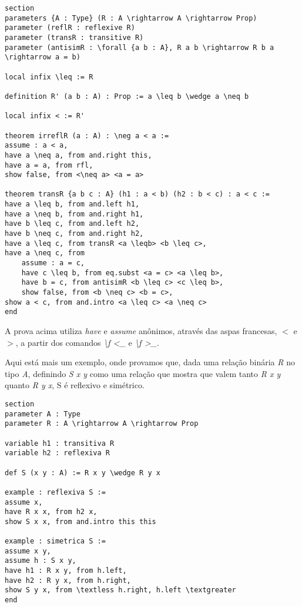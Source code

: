 \begin{lstlisting}
section
parameters {A : Type} (R : A \rightarrow A \rightarrow Prop)
parameter (reflR : reflexive R)
parameter (transR : transitive R)
parameter (antisimR : \forall {a b : A}, R a b \rightarrow R b a \rightarrow a = b)

local infix \leq := R

definition R' (a b : A) : Prop := a \leq b \wedge a \neq b

local infix < := R'

theorem irreflR (a : A) : \neg a < a :=
assume : a < a,
have a \neq a, from and.right this,
have a = a, from rfl,
show false, from <\neq a> <a = a>

theorem transR {a b c : A} (h1 : a < b) (h2 : b < c) : a < c :=
have a \leq b, from and.left h1,
have a \neq b, from and.right h1,
have b \leq c, from and.left h2,
have b \neq c, from and.right h2,
have a \leq c, from transR <a \leqb> <b \leq c>,
have a \neq c, from
    assume : a = c,
    have c \leq b, from eq.subst <a = c> <a \leq b>,
    have b = c, from antisimR <b \leq c> <c \leq b>,
    show false, from <b \neq c> <b = c>,
show a < c, from and.intro <a \leq c> <a \neq c>
end

\end{lstlisting}
A prova acima utiliza \textit{have} e \textit{assume} anônimos, através das aspas francesas, $<$ e $>$, a partir dos comandos \textit{\textbackslash f \textless \_} e \textit{\textbackslash f \textgreater \_}.

Aqui está mais um exemplo, onde provamos que, dada uma relação binária \textit{R} no tipo \textit{A}, definindo \textit{S x y} como uma relação que mostra que valem tanto \textit{R x y} quanto \textit{R y x}, S é reflexivo e simétrico.
\begin{lstlisting}
section
parameter A : Type
parameter R : A \rightarrow A \rightarrow Prop

variable h1 : transitiva R
variable h2 : reflexiva R

def S (x y : A) := R x y \wedge R y x

example : reflexiva S :=
assume x,
have R x x, from h2 x,
show S x x, from and.intro this this

example : simetrica S :=
assume x y,
assume h : S x y,
have h1 : R x y, from h.left,
have h2 : R y x, from h.right,
show S y x, from \textless h.right, h.left \textgreater
end
\end{lstlisting}
